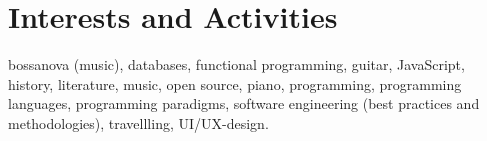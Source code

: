 \documentclass[a4paper,10pt]{article}
\begin{document}
\section{Interests and Activities}
bossanova (music), databases, functional programming, guitar, JavaScript, history, literature, music, open source, piano, programming, programming languages, programming paradigms, software engineering (best practices and methodologies), travellling, \textsc{UI}/\textsc{UX}-design.\\
\\
\end{document}
